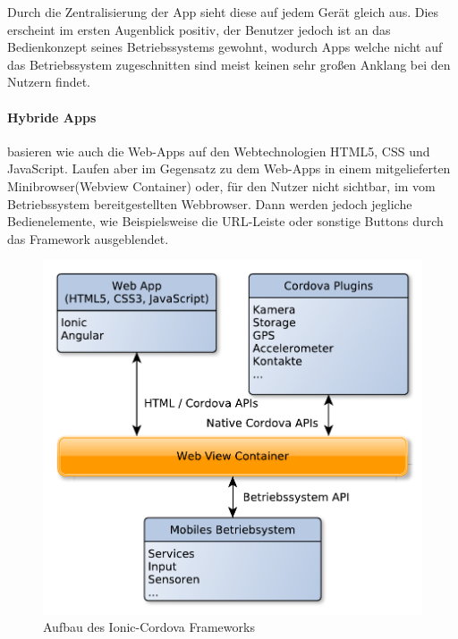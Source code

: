 Durch die Zentralisierung der App sieht diese auf jedem Gerät gleich aus. Dies erscheint im ersten Augenblick positiv, der Benutzer jedoch ist an das Bedienkonzept seines Betriebssystems gewohnt, wodurch Apps welche nicht auf das Betriebssystem zugeschnitten sind meist keinen sehr großen Anklang bei den Nutzern findet. 

\paragraph{Hybride Apps}\label{Hybride Apps} basieren wie auch die Web-Apps auf den Webtechnologien HTML5, CSS und JavaScript. Laufen aber im Gegensatz zu dem Web-Apps in einem mitgelieferten Minibrowser(Webview Container) oder, für den Nutzer nicht sichtbar, im vom Betriebssystem bereitgestellten Webbrowser. Dann werden jedoch jegliche Bedienelemente, wie Beispielsweise die URL-Leiste oder sonstige Buttons durch das Framework ausgeblendet.

\begin{figure}[H]
	\centering
	\includegraphics[scale=0.8]{images/IonicCordova}
	\caption[Aufbau des Ionic-Cordova Frameworks]{Aufbau des Ionic-Cordova Frameworks}
	\label{IonicCordova}
\end{figure}

